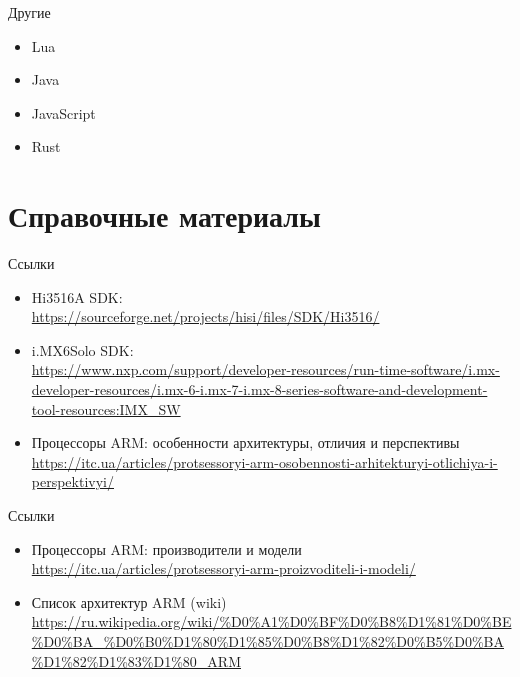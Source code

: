 \begin{frame}[fragile]{Другие}
\begin{itemize}
\item Lua
\item Java
\item JavaScript
\item Rust
\end{itemize}
\end{frame}


\section{Справочные материалы}
\begin{frame}[fragile]{Ссылки}
\begin{itemize}
\item Hi3516A SDK: \\
\url{https://sourceforge.net/projects/hisi/files/SDK/Hi3516/} 
\item i.MX6Solo SDK: \\
\url{https://www.nxp.com/support/developer-resources/run-time-software/i.mx-developer-resources/i.mx-6-i.mx-7-i.mx-8-series-software-and-development-tool-resources:IMX_SW}
\item Процессоры ARM: особенности архитектуры, отличия и перспективы \\
\url{https://itc.ua/articles/protsessoryi-arm-osobennosti-arhitekturyi-otlichiya-i-perspektivyi/}

\end{itemize}
\end{frame}


\begin{frame}[fragile]{Ссылки}
\begin{itemize}
\item Процессоры ARM: производители и модели \\
\url{https://itc.ua/articles/protsessoryi-arm-proizvoditeli-i-modeli/}
\item Список архитектур ARM (wiki)\\
\url{https://ru.wikipedia.org/wiki/%D0%A1%D0%BF%D0%B8%D1%81%D0%BE%D0%BA_%D0%B0%D1%80%D1%85%D0%B8%D1%82%D0%B5%D0%BA%D1%82%D1%83%D1%80_ARM} 

\end{itemize}
\end{frame}


